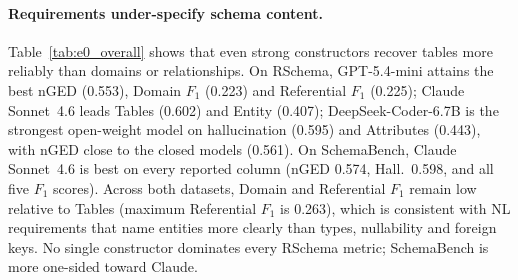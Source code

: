 \paragraph{Requirements under-specify schema content.}
Table~\ref{tab:e0_overall} shows that even strong constructors recover tables more
reliably than domains or relationships.
On RSchema, GPT-5.4-mini attains the best nGED (0.553), Domain $F_1$ (0.223) and
Referential $F_1$ (0.225); Claude Sonnet~4.6 leads Tables (0.602) and Entity (0.407);
DeepSeek-Coder-6.7B is the strongest open-weight model on hallucination (0.595) and
Attributes (0.443), with nGED close to the closed models (0.561).
On SchemaBench, Claude Sonnet~4.6 is best on every reported column (nGED 0.574,
Hall.\ 0.598, and all five $F_1$ scores).
Across both datasets, Domain and Referential $F_1$ remain low relative to Tables
(maximum Referential $F_1$ is 0.263), which is consistent with NL requirements that
name entities more clearly than types, nullability and foreign keys.
No single constructor dominates every RSchema metric; SchemaBench is more
one-sided toward Claude.

